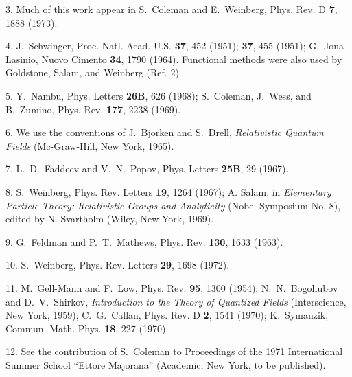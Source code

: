 \documentclass[12pt,epsf]{report}
\begin{document}
\smallskip
\smallskip

3.  Much of this work appear in S.~Coleman and E.~Weinberg, 
Phys. Rev. D {\bf 7}, 1888 (1973).

\smallskip
\smallskip

4. J.~Schwinger, Proc. Natl. Acad. U.S. {\bf 37}, 452 (1951); 
{\bf 37}, 455 (1951); \bk
G.~Jona-Lasinio, Nuovo Cimento {\bf 34}, 1790 (1964). \bk
Functional methods were also used by Goldstone, Salam, and Weinberg
(Ref. 2).

\smallskip
\smallskip

5. Y.~Nambu, Phys. Letters {\bf 26B}, 626 (1968); \bk
   S.~Coleman, J.~Wess, and B.~Zumino, Phys. Rev. {\bf 177}, 2238 (1969).

\smallskip
\smallskip

6. We use the conventions of J.~Bjorken and S.~Drell, {\it Relativistic Quantum 
Fields} (Mc-Graw-Hill, New York, 1965).

\smallskip
\smallskip

7. L.~D.~Faddeev and V.~N.~Popov, Phys. Letters {\bf 25B}, 29 (1967).

\smallskip
\smallskip

8. S.~Weinberg, Phys. Rev. Letters {\bf 19}, 1264 (1967); \bk
A. Salam, in {\it Elementary Particle Theory: Relativistic Groups and 
Analyticity} (Nobel Symposium No. 8), edited by N. Svartholm (Wiley,
New York, 1969).

\smallskip
\smallskip

9. G.~Feldman and P.~T.~Mathews, Phys. Rev. {\bf 130}, 1633 (1963).

\smallskip
\smallskip

10.  S.~Weinberg, Phys. Rev. Letters {\bf 29}, 1698 (1972).

\smallskip
\smallskip

\def\bk{\hfill\break\phantom{11.~}}

11. M.~Gell-Mann and F.~Low, Phys. Rev. {\bf 95}, 1300 (1954); \bk
  N.~N.~Bogoliubov and D.~V.~Shirkov, {\it Introduction to the Theory of 
Quantized Fields} (Interscience, New York, 1959); \bk
C.~G.~Callan, Phys. Rev. D {\bf 2}, 1541 (1970); \bk
K.~Symanzik, Commun. Math. Phys. {\bf 18}, 227 (1970).

\smallskip
\smallskip

12. See the contribution of S.~Coleman to Proceedings of the 1971
International Summer School ``Ettore Majorana'' (Academic, New York, to
be published).

\smallskip
\smallskip
\end{document}

